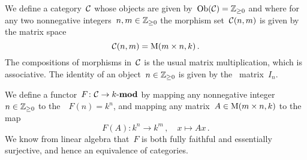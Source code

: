 \section{}

We define a category~$\mathcal{C}$ whose objects are given by~$\operatorname{Ob}(\mathcal{C}) = \mathbb{Z}_{\geq 0}$ and where for any two nonnegative integers~$n, m \in \mathbb{Z}_{\geq 0}$ the morphism set~$\mathcal{C}(n,m)$ is given by the matrix space
\[
    \mathcal{C}(n,m)
  = \operatorname{M}(m \times n, k) \,.
\]
The compositions of morphisms in~$\mathcal{C}$ is the usual matrix multiplication, which is associative.
The identity of an object~$n \in \mathbb{Z}_{\geq 0}$ is given by the~ matrix~$I_n$.

We define a functor~$F \colon \mathcal{C} \to \text{$k$-$\mathbf{mod}$}$ by mapping any nonnegative integer~$n \in \mathbb{Z}_{\geq 0}$ to the~{\kvs}~$F(n) = k^n$, and mapping any matrix~$A \in \operatorname{M}(m \times n, k)$ to the~{\klin} map
\[
          F(A)
  \colon  k^n
  \to     k^m \,,
  \quad   x
  \mapsto Ax \,.
\]
We know from linear algebra that~$F$ is both fully faithful and essentially surjective, and hence an equivalence of categories.




